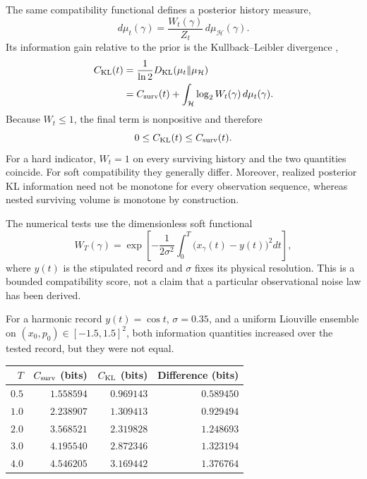 \documentclass[10pt]{article}
\begin{document}
The same compatibility functional defines a posterior history measure,
\begin{equation}
d\mu_t(\gamma)
=\frac{W_t(\gamma)}{Z_t}\,d\mu_{\mathcal H}(\gamma).
\label{eq:posterior-history}
\end{equation}
Its information gain relative to the prior is the Kullback--Leibler divergence
\citep{KullbackLeibler1951},
\begin{align}
C_{\rm KL}(t)
&=\frac{1}{\ln2}
D_{\rm KL}(\mu_t\Vert\mu_{\mathcal H})\nonumber\\
&=C_{\rm surv}(t)
+\int_{\mathcal H}\log_2 W_t(\gamma)\,d\mu_t(\gamma).
\label{eq:kl-information}
\end{align}
Because $W_t\leq1$, the final term is nonpositive and therefore
\begin{equation}
0\leq C_{\rm KL}(t)\leq C_{\rm surv}(t).
\label{eq:information-inequality}
\end{equation}
For a hard indicator, $W_t=1$ on every surviving history and the two quantities
coincide.  For soft compatibility they generally differ.  Moreover, realized
posterior KL information need not be monotone for every observation sequence,
whereas nested surviving volume is monotone by construction.

The numerical tests use the dimensionless soft functional
\begin{equation}
W_T(\gamma)
=\exp\!\left[-\frac{1}{2\sigma^2}
\int_0^T\bigl(x_\gamma(t)-y(t)\bigr)^2dt\right],
\label{eq:soft-functional}
\end{equation}
where $y(t)$ is the stipulated record and $\sigma$ fixes its physical
resolution.  This is a bounded compatibility score, not a claim that a
particular observational noise law has been derived.

For a harmonic record $y(t)=\cos t$, $\sigma=0.35$, and a uniform Liouville
ensemble on $(x_0,p_0)\in[-1.5,1.5]^2$, both information quantities increased
over the tested record, but they were not equal.

\begin{center}
\label{tab:information-functionals}
\small
\begin{tabular}{rrrr}
\toprule
$T$ & $C_{\rm surv}$ (bits) & $C_{\rm KL}$ (bits) & Difference (bits)\\
\midrule
$0.5$ & $1.558594$ & $0.969143$ & $0.589450$\\
$1.0$ & $2.238907$ & $1.309413$ & $0.929494$\\
$2.0$ & $3.568521$ & $2.319828$ & $1.248693$\\
$3.0$ & $4.195540$ & $2.872346$ & $1.323194$\\
$4.0$ & $4.546205$ & $3.169442$ & $1.376764$\\
\bottomrule
\end{tabular}
\end{center}
\end{document}
